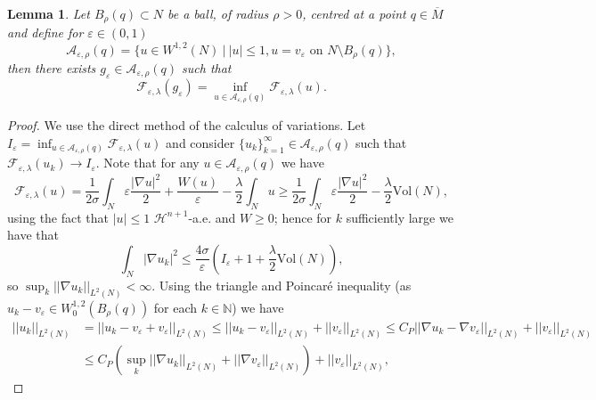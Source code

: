 \documentclass[11pt]{article}
\newtheorem{lem}{Lemma}
\begin{document}
\begin{lem}\label{lem: function minimisation}
Let $B_{\rho}(q) \subset N$ be a ball, of radius $\rho > 0$, centred at a point $q \in \overline{M}$ and define for $\varepsilon \in (0,1)$
\begin{equation*}
    \mathcal{A}_{\varepsilon,\rho}(q) = \{ u \in W^{1,2}(N) \: | \: |u| \leq 1, u = v_\varepsilon \text{ on } N \setminus B_{\rho}(q) \},
\end{equation*}
then there exists $g_\varepsilon \in \mathcal{A}_{\varepsilon,\rho}(q)$ such that \begin{equation*}
    \mathcal{F}_{\varepsilon,\lambda}(g_\varepsilon) = \inf_{u \in \mathcal{A}_{\varepsilon,\rho}(q)} \mathcal{F}_{\varepsilon,\lambda}(u).
\end{equation*}
\end{lem}
\begin{proof}
We use the direct method of the calculus of variations. Let $I_\varepsilon = \inf_{u \in \mathcal{A}_{\varepsilon,\rho}(q)} \mathcal{F}_{\varepsilon,\lambda} (u)$ and consider $\{ u_k \}_{k = 1}^\infty \in \mathcal{A}_{\varepsilon,\rho}(q)$ such that $\mathcal{F}_{\varepsilon,\lambda}(u_k) \rightarrow I_\varepsilon$. Note that for any $u \in \mathcal{A}_{\varepsilon,\rho}(q)$ we have 
\begin{equation*}
\mathcal{F}_{\varepsilon,\lambda}(u) = \frac{1}{2\sigma} \int_N \varepsilon\frac{|\nabla u|^2}{2} + \frac{W(u)}{\varepsilon} - \frac{\lambda}{2}\int_N u \geq \frac{1}{2\sigma} \int_N \varepsilon\frac{|\nabla u|^2}{2} - \frac{\lambda}{2} \mathrm{Vol}(N),
\end{equation*}
using the fact that $|u| \leq 1$ $\mathcal{H}^{n+1}$-a.e. and $W \geq 0$; hence for $k$ sufficiently large we have that
\begin{equation*}
\int_N |\nabla u_k|^2 \leq \frac{4\sigma}{\varepsilon}
\left(I_\varepsilon + 1 + \frac{\lambda}{2}\mathrm{Vol}(N)\right),
\end{equation*}
so $\sup_k ||\nabla u_k||_{L^2(N)} < \infty$. Using the triangle and Poincar\'e inequality (as $u_k - v_\varepsilon \in W^{1,2}_0(B_{\rho}(q))$ for each $k \in \mathbb{N}$) we have
\begin{align*}
||u_k||_{L^2(N)} &= || u_k - v_\varepsilon + v_\varepsilon ||_{L^2(N)} \leq || u_k - v_\varepsilon ||_{L^2(N)} + ||v_\varepsilon||_{L^2(N)} \leq C_P|| \nabla u_k - \nabla v_\varepsilon ||_{L^2(N)} + ||v_\varepsilon||_{L^2(N)}\\
&\leq C_P (\sup_k ||\nabla u_k||_{L^2(N)} + ||\nabla v_\varepsilon ||_{L^2(N)}) + ||v_\varepsilon||_{L^2(N)},

\end{align*}
\end{proof}
\end{document}
